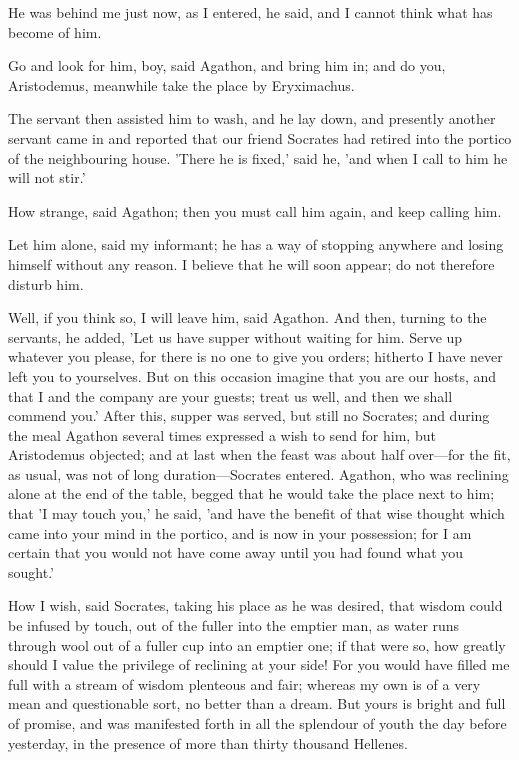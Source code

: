 \para[28] He was behind me just now, as I entered, he said, and I cannot think what has become of him.

\para[29] Go and look for him, boy, said Agathon, and bring him in; and do you, Aristodemus, meanwhile take the place by Eryximachus.

\para[30] The servant then assisted him to wash, and he lay down, and presently another servant came in and reported that our friend Socrates had retired into the portico of the neighbouring house. 'There he is fixed,' said he, 'and when I call to him he will not stir.'

\para[31] How strange, said Agathon; then you must call him again, and keep calling him.

\para[32] Let him alone, said my informant; he has a way of stopping anywhere and losing himself without any reason. I believe that he will soon appear; do not therefore disturb him.

\para[33] Well, if you think so, I will leave him, said Agathon. And then, turning to the servants, he added, 'Let us have supper without waiting for him. Serve up whatever you please, for there is no one to give you orders; hitherto I have never left you to yourselves. But on this occasion imagine that you are our hosts, and that I and the company are your guests; treat us well, and then we shall commend you.' After this, supper was served, but still no Socrates; and during the meal Agathon several times expressed a wish to send for him, but Aristodemus objected; and at last when the feast was about half over---for the fit, as usual, was not of long duration---Socrates entered. Agathon, who was reclining alone at the end of the table, begged that he would take the place next to him; that 'I may touch you,' he said, 'and have the benefit of that wise thought which came into your mind in the portico, and is now in your possession; for I am certain that you would not have come away until you had found what you sought.'

\para[34] How I wish, said Socrates, taking his place as he was desired, that wisdom could be infused by touch, out of the fuller into the emptier man, as water runs through wool out of a fuller cup into an emptier one; if that were so, how greatly should I value the privilege of reclining at your side! For you would have filled me full with a stream of wisdom plenteous and fair; whereas my own is of a very mean and questionable sort, no better than a dream. But yours is bright and full of promise, and was manifested forth in all the splendour of youth the day before yesterday, in the presence of more than thirty thousand Hellenes.

